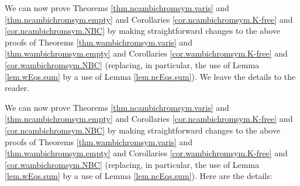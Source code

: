 \documentclass[numbers=enddot,12pt,final,onecolumn,notitlepage]{scrartcl}%
\theoremstyle{definition}
\newenvironment{verlong}{}{}
\newenvironment{vershort}{}{}
\begin{document}
\begin{vershort}
We can now prove Theorems \ref{thm.ncambichromsym.varis} and
\ref{thm.ncambichromsym.empty} and Corollaries \ref{cor.ncambichromsym.K-free}
and \ref{cor.ncambichromsym.NBC} by making straightforward changes to the
above proofs of Theorems \ref{thm.wambichromsym.varis} and
\ref{thm.wambichromsym.empty} and Corollaries \ref{cor.wambichromsym.K-free}
and \ref{cor.wambichromsym.NBC} (replacing, in particular, the use of Lemma
\ref{lem.wEqs.sum} by a use of Lemma \ref{lem.ncEqs.sum}). We leave the
details to the reader.
\end{vershort}

\begin{verlong}
We can now prove Theorems \ref{thm.ncambichromsym.varis} and
\ref{thm.ncambichromsym.empty} and Corollaries \ref{cor.ncambichromsym.K-free}
and \ref{cor.ncambichromsym.NBC} by making straightforward changes to the
above proofs of Theorems \ref{thm.wambichromsym.varis} and
\ref{thm.wambichromsym.empty} and Corollaries \ref{cor.wambichromsym.K-free}
and \ref{cor.wambichromsym.NBC} (replacing, in particular, the use of Lemma
\ref{lem.wEqs.sum} by a use of Lemma \ref{lem.ncEqs.sum}). Here are the details:


\end{verlong}
\end{document}
